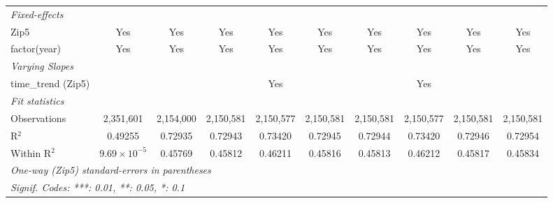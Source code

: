 \begin{table}[H]
{\begin{tabular}{lccccccccc}
 \midrule \emph{Fixed-effects}&   &   &   &   &   &   &   &   &  \\ 

 Zip5 & Yes & Yes & Yes & Yes & Yes & Yes & Yes & Yes & Yes\\ 

 factor(year) & Yes & Yes & Yes & Yes & Yes & Yes & Yes & Yes & Yes\\ 

 \midrule \emph{Varying Slopes}&   &   &   &   &   &   &   &   &  \\ 

 time\_trend (Zip5) &  &  &  & Yes &  &  & Yes &  & \\ 

 \midrule \emph{Fit statistics}&  & & & & & & & & \\ 

 Observations & 2,351,601&2,154,000&2,150,581&2,150,577&2,150,581&2,150,581&2,150,577&2,150,581&2,150,581\\ 

 R$^2$ & 0.49255&0.72935&0.72943&0.73420&0.72945&0.72944&0.73420&0.72946&0.72954\\ 

 Within R$^2$ & $9.69\times 10^{-5}$&0.45769&0.45812&0.46211&0.45816&0.45813&0.46212&0.45817&0.45834\\ 

 \midrule\midrule\multicolumn{10}{l}{\emph{One-way (Zip5) standard-errors in parentheses}}\\ 

 \multicolumn{10}{l}{\emph{Signif. Codes: ***: 0.01, **: 0.05, *: 0.1}}\\ 

 \end{tabular}} 

 \end{table} 

  

